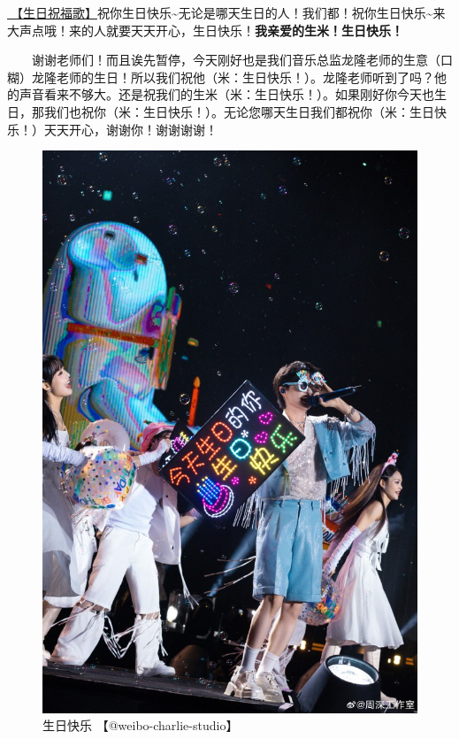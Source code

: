 \documentclass[]{ctexbook}
\begin{document}
\hyperref[happy-birthday]{🎵【生日祝福歌】}祝你生日快乐\textasciitilde 无论是哪天生日的人！我们都！祝你生日快乐\textasciitilde 来大声点哦！来的人就要天天开心，生日快乐！\textbf{我亲爱的生米！生日快乐！}

  谢谢老师们！而且诶先暂停，今天刚好也是我们音乐总监龙隆老师的生意（口糊）龙隆老师的生日！所以我们祝他（米：生日快乐！）。龙隆老师听到了吗？他的声音看来不够大。还是祝我们的生米（米：生日快乐！）。如果刚好你今天也生日，那我们也祝你（米：生日快乐！）。无论您哪天生日我们都祝你（米：生日快乐！）天天开心，谢谢你！谢谢谢谢！

\begin{figure}

{\centering \includegraphics[width=400pt]{img/wuhan20240727/001} 

}

\caption{生日快乐 【@weibo-charlie-studio】}\label{fig:unnamed-chunk-68}
\end{figure}
\end{document}

